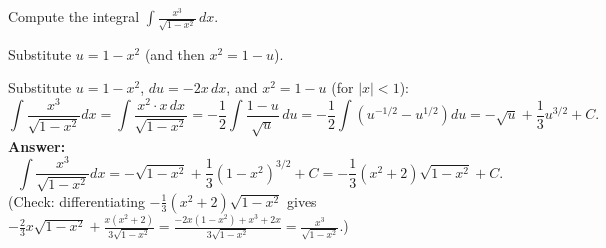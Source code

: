 
\begin{question}
Compute the integral $\displaystyle\int\frac{x^3}{\sqrt{1-x^2}}\,dx$.
\end{question}

\begin{hint}
Substitute $u=1-x^2$ (and then $x^2=1-u$).
\end{hint}

\begin{solution}
Substitute $u=1-x^2$, $du=-2x\,dx$, and $x^2=1-u$ (for $|x|<1$):
\[
\int\frac{x^3}{\sqrt{1-x^2}}dx=\int\frac{x^2\cdot x\,dx}{\sqrt{1-x^2}}=-\frac12\int\frac{1-u}{\sqrt u}\,du=-\frac12\int\left(u^{-1/2}-u^{1/2}\right)du
=-\sqrt u+\frac13u^{3/2}+C.
\]
\textbf{Answer:}
\[
\int\frac{x^3}{\sqrt{1-x^2}}dx=-\sqrt{1-x^2}+\frac13(1-x^2)^{3/2}+C=-\frac13(x^2+2)\sqrt{1-x^2}+C.
\]
(Check: differentiating $-\frac13(x^2+2)\sqrt{1-x^2}$ gives $-\frac23x\sqrt{1-x^2}+\frac{x(x^2+2)}{3\sqrt{1-x^2}}=\frac{-2x(1-x^2)+x^3+2x}{3\sqrt{1-x^2}}=\frac{x^3}{\sqrt{1-x^2}}$.)
\end{solution}
